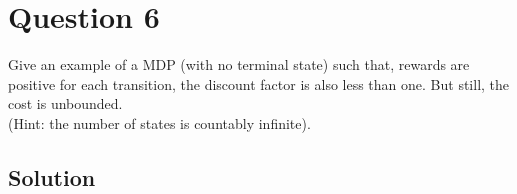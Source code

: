 \section*{Question 6}

Give an example of a MDP (with no terminal state) such that, rewards are positive for each transition, the discount factor is also less than one.
But still, the cost is unbounded. \\
(Hint: the number of states is countably infinite).

\subsection*{Solution}
